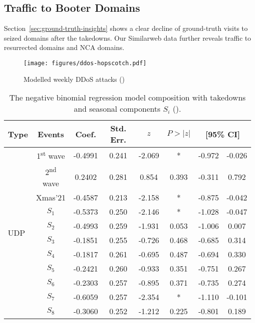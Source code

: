 \documentclass[letterpaper,twocolumn,10pt]{article}
\begin{document}
\subsection{Traffic to Booter Domains} \label{subsec:traffic-to-booter-domains}
Section~\ref{sec:ground-truth-insights} shows a clear decline of ground-truth visits to seized domains after the takedowns. Our Similarweb data further reveals traffic to resurrected domains and NCA domains.

\begin{figure}[t]
    \centering
    \texttt{[image: figures/ddos-hopscotch.pdf]}\\
    \caption{Modelled weekly DDoS attacks (\hopscotch)}
    \label{fig:ddos-hopscotch}
\end{figure}
\begin{table}[t]
\centering
\vspace{-4mm}
\caption{The negative binomial regression model composition with takedowns and seasonal components $S_i$ (\hopscotch).}
\setlength{\tabcolsep}{0.225em}
\vspace{2mm}
\small
\begin{tabular}{lccccccc}
    \toprule
    Type & Events & Coef. & Std. Err. & $z$ & $P>|z|$ & \multicolumn{2}{c}{[95\% CI]}\\
    \midrule
    \multirow{15}{*}{UDP} & 1\textsuperscript{st} wave & -0.4991 &  0.241 & -2.069 &  * &  -0.972 &  -0.026\\
    & 2\textsuperscript{nd} wave & 0.2402 &  0.281 &  0.854 &  0.393 &  -0.311 &   0.792\\
    & Xmas'21 & -0.4587 &  0.213 & -2.158 &  * &  -0.875 &  -0.042\\
    & $S_{1}$ &  -0.5373 &  0.250 & -2.146 &  * &  -1.028 &  -0.047\\
    & $S_{2}$ &  -0.4993 &  0.259 & -1.931 &  0.053 &  -1.006 &   0.007\\
    & $S_{3}$ &  -0.1851 &  0.255 & -0.726 &  0.468 &  -0.685 &   0.314\\
    & $S_{4}$ &  -0.1817 &  0.261 & -0.695 &  0.487 &  -0.694 &   0.330\\
    & $S_{5}$ &  -0.2421 &  0.260 & -0.933 &  0.351 &  -0.751 &   0.267\\
    & $S_{6}$ &  -0.2303 &  0.257 & -0.895 &  0.371 &  -0.735 &   0.274\\
    & $S_{7}$ &  -0.6059 &  0.257 & -2.354 &  * &  -1.110 &  -0.101\\
    & $S_{8}$ &  -0.3060 &  0.252 & -1.212 &  0.225 &  -0.801 &   0.189\\

\end{tabular}
\end{table}
\end{document}
